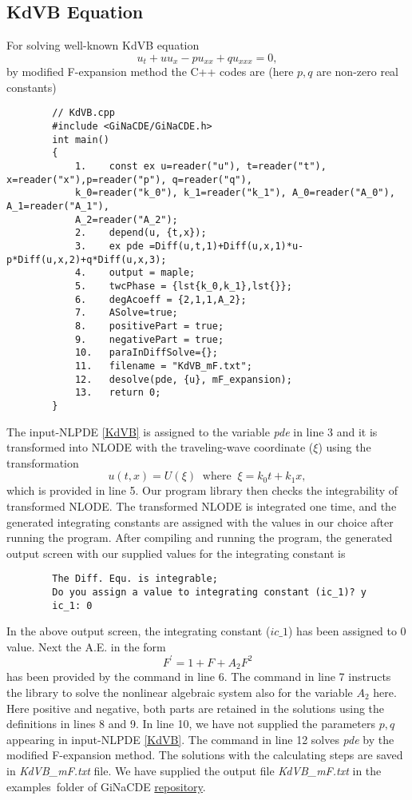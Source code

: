 \documentclass[prd,aps,floats,showkeys,nofootinbib,notitlepage]{revtex4}
\begin{document}
	\subsection{KdVB Equation}
	For solving well-known KdVB equation %
	\begin{equation}\label{KdVB}
		{u_t} + u{u_x} - p{u_{xx}} + q{u_{xxx}} = 0,
	\end{equation}
	by modified F-expansion method the C++ codes are (here $p,q$ are non-zero real constants)\\
	\begin{verbatim}
		// KdVB.cpp
		#include <GiNaCDE/GiNaCDE.h>
		int main()
		{
			1.    const ex u=reader("u"), t=reader("t"), x=reader("x"),p=reader("p"), q=reader("q"),
			k_0=reader("k_0"), k_1=reader("k_1"), A_0=reader("A_0"), A_1=reader("A_1"), 
			A_2=reader("A_2");   
			2.    depend(u, {t,x});
			3.    ex pde =Diff(u,t,1)+Diff(u,x,1)*u-p*Diff(u,x,2)+q*Diff(u,x,3);
			4.    output = maple;  
			5.    twcPhase = {lst{k_0,k_1},lst{}};
			6.    degAcoeff = {2,1,1,A_2};
			7.    ASolve=true;
			8.    positivePart = true; 
			9.    negativePart = true;
			10.   paraInDiffSolve={};
			11.   filename = "KdVB_mF.txt";
			12.   desolve(pde, {u}, mF_expansion);
			13.   return 0;
		}
	\end{verbatim}
	The input-NLPDE \eqref{KdVB} is assigned to the variable {\em pde} in line 3 and it is transformed into NLODE with the traveling-wave coordinate ($\xi$) using the transformation 
	\begin{equation}\label{KdVB_twtrans}
		u(t,x)=U(\xi)\;\;\text{where}\;\;\xi=k_0t+k_1x,
	\end{equation}
	which is provided in line 5.
	Our program library then checks the integrability of transformed NLODE. The transformed NLODE is integrated one time, and the generated integrating constants are assigned with the values in our choice after running the program. After compiling and running the program, the generated output screen with our supplied values for the integrating constant is
	\begin{verbatim}
		The Diff. Equ. is integrable;
		Do you assign a value to integrating constant (ic_1)? y
		ic_1: 0
	\end{verbatim}
	In the above output screen, the integrating constant ($ic\_1$) has been assigned to $0$ value.
	Next the A.E. in the form 
	\begin{equation}\label{KdVBAE}
		F^{\prime}=1+F+A_2F^2
	\end{equation}
	has been provided by the command in line 6. The command in line 7 instructs the library to solve the nonlinear algebraic system also for the variable $A_2$ here.
	Here positive and negative, both parts are retained in the solutions using the definitions in lines 8 and 9. In line 10, we have not supplied the parameters $p,q$ appearing in input-NLPDE \eqref{KdVB}.
	The command in line 12 solves {\em pde} by the modified F-expansion method. 
	The solutions with the calculating steps are saved in {\em KdVB\_mF.txt} file.
	We have supplied the output file {\em KdVB\_mF.txt} in the examples\ folder of GiNaCDE \href{https://github.com/mithun218/GiNaCDE}{repository}.
	
\end{document}

